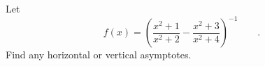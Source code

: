 Let
\begin{equation*}
  f(x) = \left(\frac{x^2+1}{x^2+2}-\frac{x^2+3}{x^2+4}\right)^{-1} 
       \qquad .
\end{equation*}
Find any horizontal or vertical asymptotes.
